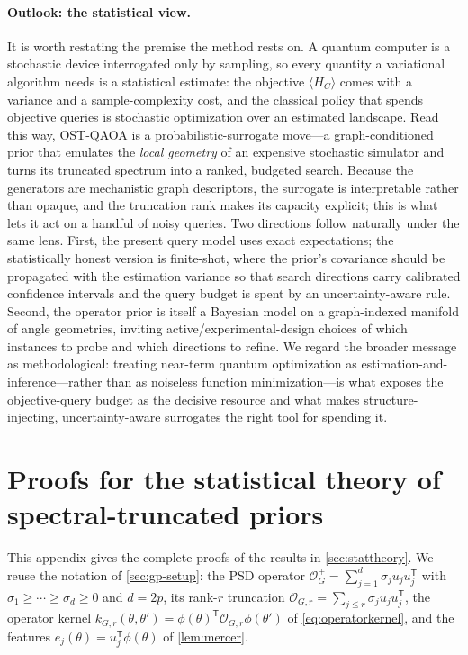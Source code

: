 \documentclass[aps,prxquantum,reprint,amsmath,amssymb,floatfix,nofootinbib,superscriptaddress,longbibliography]{revtex4-2}
\theoremstyle{remark}
\newcommand{\OSTQAOA}{\textnormal{\textsc{OST-QAOA}}}
\newcommand{\calO}{\mathcal{O}}
\begin{document}
\paragraph{Outlook: the statistical view.}
It is worth restating the premise the method rests on.  A quantum computer is a
stochastic device interrogated only by sampling, so every quantity a variational
algorithm needs is a statistical estimate: the objective \(\langle H_C\rangle\)
comes with a variance and a sample-complexity cost, and the classical policy that
spends objective queries is stochastic optimization over an estimated landscape.
Read this way, \OSTQAOA{} is a probabilistic-surrogate move---a graph-conditioned
prior that emulates the \emph{local geometry} of an expensive stochastic simulator
and turns its truncated spectrum into a ranked, budgeted search.  Because the
generators are mechanistic graph descriptors, the surrogate is interpretable
rather than opaque, and the truncation rank makes its capacity explicit; this is
what lets it act on a handful of noisy queries.  Two directions follow naturally
under the same lens.  First, the present query model uses exact expectations; the
statistically honest version is finite-shot, where the prior's covariance should
be propagated with the estimation variance so that search directions carry
calibrated confidence intervals and the query budget is spent by an
uncertainty-aware rule.  Second, the operator prior is itself a Bayesian model on
a graph-indexed manifold of angle geometries, inviting active/experimental-design
choices of which instances to probe and which directions to refine.  We regard the
broader message as methodological: treating near-term quantum optimization as
estimation-and-inference---rather than as noiseless function minimization---is what
exposes the objective-query budget as the decisive resource and what makes
structure-injecting, uncertainty-aware surrogates the right tool for spending it.

\appendix
\section{Proofs for the statistical theory of spectral-truncated priors}
\label{app:proofs}

This appendix gives the complete proofs of the results in
\cref{sec:stattheory}.  We reuse the notation of \cref{sec:gp-setup}: the PSD
operator \(\calO_G^{+}=\sum_{j=1}^{d}\sigma_j u_ju_j^{\mathsf T}\) with
\(\sigma_1\ge\cdots\ge\sigma_d\ge0\) and \(d=2p\), its rank-\(r\) truncation
\(\calO_{G,r}=\sum_{j\le r}\sigma_j u_ju_j^{\mathsf T}\), the operator kernel
\(k_{G,r}(\theta,\theta')=\phi(\theta)^{\mathsf T}\calO_{G,r}\phi(\theta')\) of
\cref{eq:operatorkernel}, and the features \(e_j(\theta)=u_j^{\mathsf
T}\phi(\theta)\) of \cref{lem:mercer}.
\end{document}
